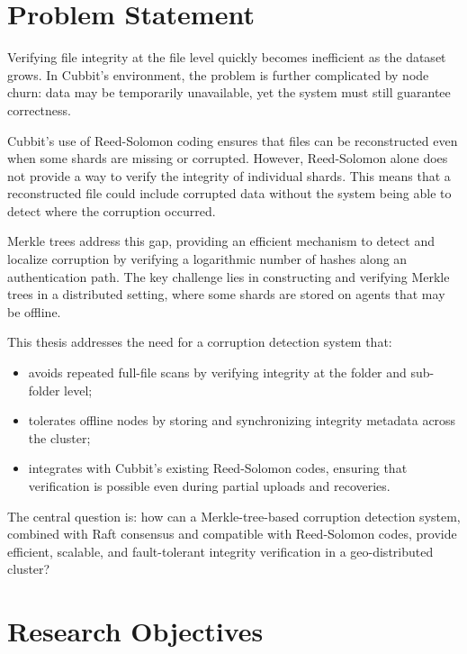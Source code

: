 \section{Problem Statement}
Verifying file integrity at the file level quickly becomes inefficient as the dataset grows. In Cubbit's environment, the problem is further complicated by node churn: data may be temporarily unavailable, yet the system must still guarantee correctness.

Cubbit's use of Reed-Solomon coding ensures that files can be reconstructed even when some shards are missing or corrupted. However, Reed-Solomon alone does not provide a way to verify the integrity of individual shards. This means that a reconstructed file could include corrupted data without the system being able to detect where the corruption occurred.

Merkle trees address this gap, providing an efficient mechanism to detect and localize corruption by verifying a logarithmic number of hashes along an authentication path. The key challenge lies in constructing and verifying Merkle trees in a distributed setting, where some shards are stored on agents that may be offline.

This thesis addresses the need for a corruption detection system that:
\begin{itemize}
\item avoids repeated full-file scans by verifying integrity at the folder and sub-folder level;
\item tolerates offline nodes by storing and synchronizing integrity metadata across the cluster;
\item integrates with Cubbit’s existing Reed-Solomon codes, ensuring that verification is possible even during partial uploads and recoveries.
\end{itemize}

The central question is: how can a Merkle-tree-based corruption detection system, combined with Raft consensus and compatible with Reed-Solomon codes, provide efficient, scalable, and fault-tolerant integrity verification in a geo-distributed cluster?

\section{Research Objectives}

